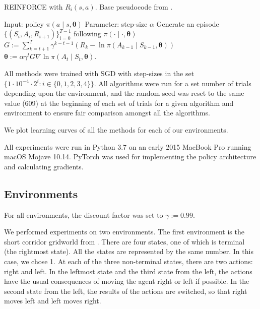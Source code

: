 \documentclass{article}
\begin{document}
  \begin{algorithm}
    \caption{REINFORCE with $R_i(s, a)$. Base pseudocode from \citet[p.328]{sutton2018reinforcement}.}
    \label{alg:information_content}
    \begin{algorithmic}
      \State Input: policy $\pi(a \mid s, \bm{\theta})$
      \State Parameter: step-size $\alpha$
        \State Generate an episode $\{(S_i, A_i, R_{i + 1})\}_{i = 0}^{T - 1}$ following $\pi(\cdot \mid \cdot, \bm{\theta})$
          \State $G := \sum_{k = t + 1}^T \gamma^{k - t - 1} (R_k - \ln \pi(A_{k - 1} \mid S_{k - 1}, \bm{\theta}))$
          \State $\bm{\theta} := \alpha \gamma^t G \nabla \ln \pi(A_t \mid S_t, \bm{\theta})$.
        \EndFor
      \EndFor
    \end{algorithmic}
  \end{algorithm}

  All methods were trained with SGD with step-sizes in the set $\{1 \cdot 10^{-4} \cdot 2^i : i \in \{0, 1, 2, 3, 4\}\}$. All algorithms were run for a set number of trials depending upon the environment, and the random seed was reset to the same value (609) at the beginning of each set of trials for a given algorithm and environment to ensure fair comparison amongst all the algorithms.

  We plot learning curves of all the methods for each of our environments.

  All experiments were run in Python 3.7 on an early 2015 MacBook Pro running macOS Mojave 10.14. PyTorch was used for implementing the policy architecture and calculating gradients.

  \subsection{Environments}
  For all environments, the discount factor was set to $\gamma := 0.99$.

  We performed experiments on two environments. The first environment is the short corridor gridworld from \citet[p.~323]{sutton2018reinforcement}. There are four states, one of which is terminal (the rightmost state). All the states are represented by the same number. In this case, we chose 1. At each of the three non-terminal states, there are two actions: right and left. In the leftmost state and the third state from the left, the actions have the usual consequences of moving the agent right or left if possible. In the second state from the left, the results of the actions are switched, so that right moves left and left moves right.
\end{document}
